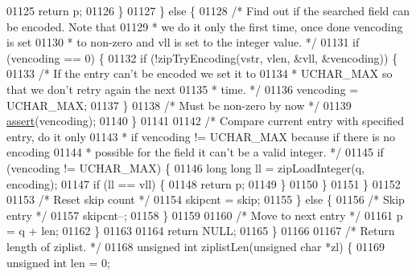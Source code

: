 \begin{DoxyCode}
{{01125                     \textcolor{keywordflow}{return} p;
01126                 \}
01127             \} \textcolor{keywordflow}{else} \{
01128                 \textcolor{comment}{/* Find out if the searched field can be encoded. Note that}
01129 \textcolor{comment}{                 * we do it only the first time, once done vencoding is set}
01130 \textcolor{comment}{                 * to non-zero and vll is set to the integer value. */}
01131                 \textcolor{keywordflow}{if} (vencoding == 0) \{
01132                     \textcolor{keywordflow}{if} (!zipTryEncoding(vstr, vlen, &vll, &vencoding)) \{
01133                         \textcolor{comment}{/* If the entry can't be encoded we set it to}
01134 \textcolor{comment}{                         * UCHAR\_MAX so that we don't retry again the next}
01135 \textcolor{comment}{                         * time. */}
01136                         vencoding = UCHAR\_MAX;
01137                     \}
01138                     \textcolor{comment}{/* Must be non-zero by now */}
01139                     \hyperlink{redisassert_8h_a993abaa2c168852c1592879472938781}{assert}(vencoding);
01140                 \}
01141 
01142                 \textcolor{comment}{/* Compare current entry with specified entry, do it only}
01143 \textcolor{comment}{                 * if vencoding != UCHAR\_MAX because if there is no encoding}
01144 \textcolor{comment}{                 * possible for the field it can't be a valid integer. */}
01145                 \textcolor{keywordflow}{if} (vencoding != UCHAR\_MAX) \{
01146                     \textcolor{keywordtype}{long} \textcolor{keywordtype}{long} ll = zipLoadInteger(q, encoding);
01147                     \textcolor{keywordflow}{if} (ll == vll) \{
01148                         \textcolor{keywordflow}{return} p;
01149                     \}
01150                 \}
01151             \}
01152 
01153             \textcolor{comment}{/* Reset skip count */}
01154             skipcnt = skip;
01155         \} \textcolor{keywordflow}{else} \{
01156             \textcolor{comment}{/* Skip entry */}
01157             skipcnt--;
01158         \}
01159 
01160         \textcolor{comment}{/* Move to next entry */}
01161         p = q + len;
01162     \}
01163 
01164     \textcolor{keywordflow}{return} NULL;
01165 \}
01166 
01167 \textcolor{comment}{/* Return length of ziplist. */}
01168 \textcolor{keywordtype}{unsigned} \textcolor{keywordtype}{int} ziplistLen(\textcolor{keywordtype}{unsigned} \textcolor{keywordtype}{char} *zl) \{
01169     \textcolor{keywordtype}{unsigned} \textcolor{keywordtype}{int} len = 0;
}}
\end{DoxyCode}
